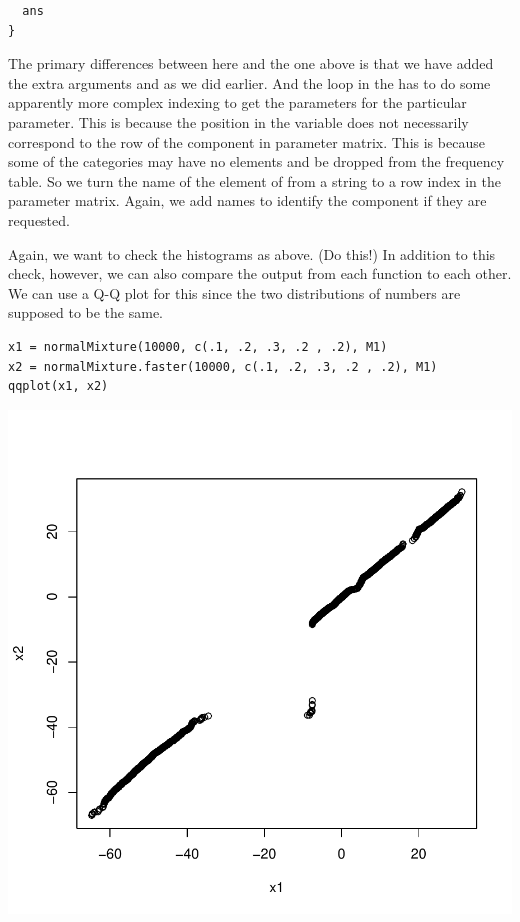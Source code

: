 \documentclass{article}
\begin{document}
\begin{description}
\begin{verbatim}
  ans
}
\end{verbatim}
The primary differences between here and the one above is that we have
added the extra arguments  and 
as we did earlier.  And the loop in the  has to do
some apparently more complex indexing to get the parameters for the
particular parameter.  This is because the position in the
 variable does not necessarily correspond to the row
of the component in parameter matrix. This is because some of the
categories may have no elements and be dropped from the frequency
table.  So we turn the name of the element of  from a
string to a row index in the parameter matrix.  Again, we add names to
identify the component if they are requested.

Again, we want to check the histograms as above.  (Do this!)  In
addition to this check, however, we can also compare the output from
each function to each other.  We can use a Q-Q plot for this since the
two distributions of numbers are supposed to be the same.

\begin{verbatim}
x1 = normalMixture(10000, c(.1, .2, .3, .2 , .2), M1)
x2 = normalMixture.faster(10000, c(.1, .2, .3, .2 , .2), M1)
qqplot(x1, x2)
\end{verbatim}
\includegraphics{images/algorithmBasicQQplot.pdf}


\end{description}
\end{document}
